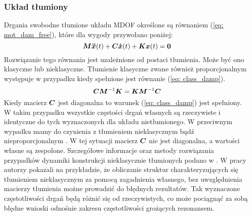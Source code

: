 \subsubsection{Układ tłumiony}
Drgania swobodne tłumione układu MDOF określone są równaniem (\ref{eq: mot_dam_free}), które dla wygody przywołano poniżej:
\begin{equation} \label{eq: mot_dam_free2}
\bm{M} \bm{\ddot{x}}(t) +\bm{C} \bm{\dot{x}}(t)+ \bm{Kx}(t) = \bm{0}
\end{equation}
Rozwiązanie tego równania jest uzależnione od postaci tłumienia. Może być ono klasyczne lub nieklasyczne. Tłumienie klasyczne zwane również proporcjonalnym  występuje w przypadku kiedy spełnione jest równanie (\ref{eq: class_damp}). 
\begin{equation} \label{eq: class_damp}
\bm{CM}^{-1}\bm{K} = \bm{KM}^{-1}\bm{C}
\end{equation}
Kiedy macierz $\bm{C}$ jest diagonalna to warunek (\ref{eq: class_damp}) jest spełniony. W takim przypadku wszystkie częstości drgań własnych są rzeczywiste i identyczne do tych wyznaczonych dla układu nietłumionego. W przeciwnym wypadku mamy do czynienia z tłumieniem nieklasycznym bądź nieproporcjonalnym . W tej sytuacji macierz $\bm{C}$ nie jest diagonalna, a wartości własne są zespolone. Szczegółowe informacje oraz metody rozwiązania przypadków dynamiki konstrukcji nieklasycznie tłumionych podano w \parencite{Chopra2012a,Caughey1961}. W pracy \cite{Inman1995} autorzy pokazali na przykładzie, że obliczanie struktur charakteryzujących się tłumieniem nieklasycznym za pomocą zagadnienia własnego, bez uwzględnienia macierzy tłumienia możne prowadzić do błędnych rezultatów. Tak wyznaczone częstotliwości drgań będą różnić się od rzeczywistych, co może pociągnąć za sobą błędne wnioski odnośnie zakresu częstotliwości grożących rezonansem.
